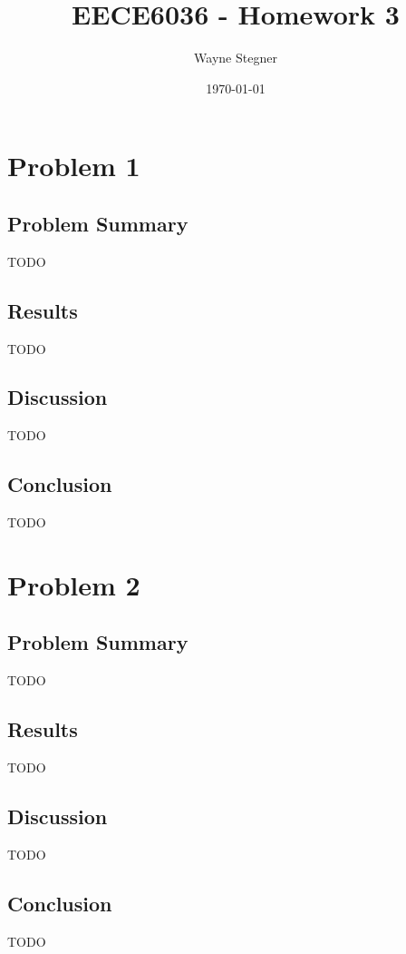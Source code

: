 \documentclass[a4paper, 11pt, titlepage]{article}
\title{EECE6036 - Homework 3}
\author{Wayne Stegner}
\date{\today}
\begin{document}
  \maketitle
  \section{Problem 1}
  \subsection{Problem Summary}
  \par TODO
  \subsection{Results}
  \par TODO
  \subsection{Discussion}
  \par TODO
  \subsection{Conclusion}
  \par TODO
  \pagebreak

  \section{Problem 2}
  \subsection{Problem Summary}
  \par TODO
  \subsection{Results}
  \par TODO
  \subsection{Discussion}
  \par TODO
  \subsection{Conclusion}
  \par TODO
  \pagebreak
\end{document}
